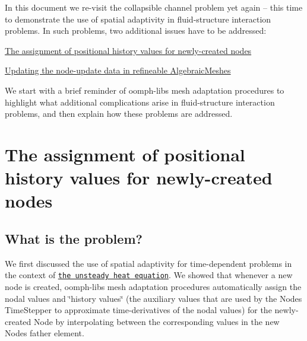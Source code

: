 In this document we re-\/visit the collapsible channel problem yet again -- this time to demonstrate the use of spatial adaptivity in fluid-\/structure interaction problems. In such problems, two additional issues have to be addressed\+:
\begin{DoxyEnumerate}
\item \hyperlink{index_history}{The assignment of positional history values for newly-\/created nodes}
\item \hyperlink{index_update_node_update}{Updating the node-\/update data in refineable Algebraic\+Meshes}
\end{DoxyEnumerate}We start with a brief reminder of {\ttfamily oomph-\/lib\textquotesingle{}s} mesh adaptation procedures to highlight what additional complications arise in fluid-\/structure interaction problems, and then explain how these problems are addressed.



 

\hypertarget{index_history}{}\section{The assignment of positional history values for newly-\/created nodes}\label{index_history}
\hypertarget{index_what}{}\subsection{What is the problem?}\label{index_what}
We first discussed the use of spatial adaptivity for time-\/dependent problems in the context of \href{../../../unsteady_heat/two_d_unsteady_heat_adapt/html/index.html#spatial_adapt}{\tt the unsteady heat equation}. We showed that whenever a new node is created, {\ttfamily oomph-\/lib\textquotesingle{}s} mesh adaptation procedures automatically assign the nodal values and \char`\"{}history values\char`\"{} (the auxiliary values that are used by the {\ttfamily Node\textquotesingle{}s} {\ttfamily Time\+Stepper} to approximate time-\/derivatives of the nodal values) for the newly-\/created {\ttfamily Node} by interpolating between the corresponding values in the new {\ttfamily Node\textquotesingle{}s} father element.

